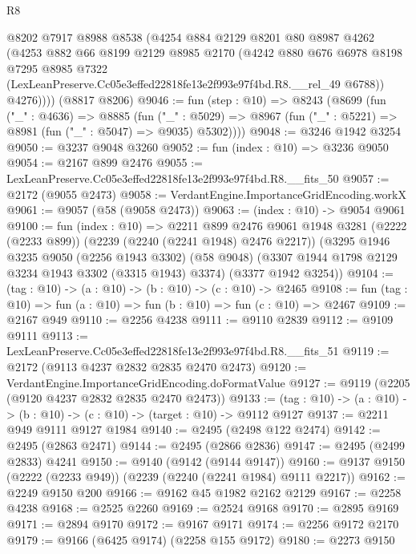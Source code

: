 \begin{lexlean}{R8}
\begin{coremodule}
        @8202
        @7917
        @8988
        @8538
        (@4254
          @884
          @2129
          @8201
          @80
          @8987
          @4262
          (@4253
            @882
            @66
            @8199
            @2129
            @8985
            @2170
            (@4242
              @880
              @676
              @6978
              @8198
              @7295
              @8985
              @7322
              (LexLeanPreserve.Cc05e3effed22818fe13e2f993e97f4bd.R8.__rel_49 @6788))
            @4276))))
    (@8817 @8206)
@9046 := fun (step : @10) =>
  @8243
    (@8699
      (fun ("_" : @4636) =>
      @8885
        (fun ("_" : @5029) =>
        @8967 (fun ("_" : @5221) => @8981 (fun ("_" : @5047) => @9035) @5302))))
@9048 := @3246 @1942 @3254
@9050 := @3237 @9048 @3260
@9052 := fun (index : @10) => @3236 @9050
@9054 := @2167 @899 @2476
@9055 := LexLeanPreserve.Cc05e3effed22818fe13e2f993e97f4bd.R8.__fits_50
@9057 := @2172 (@9055 @2473)
@9058 := VerdantEngine.ImportanceGridEncoding.workX
@9061 := @9057 (@58 (@9058 @2473))
@9063 := (index : @10) -> @9054 @9061
@9100 := fun (index : @10) =>
  @2211
    @899
    @2476
    @9061
    @1948
    @3281
    (@2222 (@2233 @899))
    (@2239 (@2240 (@2241 @1948) @2476 @2217))
    (@3295
      @1946
      @3235
      @9050
      (@2256 @1943 @3302)
      (@58 @9048)
      (@3307 @1944 @1798 @2129 @3234 @1943 @3302 (@3315 @1943) @3374)
      (@3377 @1942 @3254))
@9104 := (tag : @10) -> (a : @10) -> (b : @10) -> (c : @10) -> @2465
@9108 := fun (tag : @10) => fun (a : @10) => fun (b : @10) => fun (c : @10) => @2467
@9109 := @2167 @949
@9110 := @2256 @4238
@9111 := @9110 @2839
@9112 := @9109 @9111
@9113 := LexLeanPreserve.Cc05e3effed22818fe13e2f993e97f4bd.R8.__fits_51
@9119 := @2172 (@9113 @4237 @2832 @2835 @2470 @2473)
@9120 := VerdantEngine.ImportanceGridEncoding.doFormatValue
@9127 := @9119 (@2205 (@9120 @4237 @2832 @2835 @2470 @2473))
@9133 := (tag : @10) -> (a : @10) -> (b : @10) -> (c : @10) -> (target : @10) -> @9112 @9127
@9137 := @2211 @949 @9111 @9127 @1984
@9140 := @2495 (@2498 @122 @2474)
@9142 := @2495 (@2863 @2471)
@9144 := @2495 (@2866 @2836)
@9147 := @2495 (@2499 @2833) @4241
@9150 := @9140 (@9142 (@9144 @9147))
@9160 := @9137 @9150 (@2222 (@2233 @949)) (@2239 (@2240 (@2241 @1984) @9111 @2217))
@9162 := @2249 @9150 @200
@9166 := @9162 @45 @1982 @2162 @2129
@9167 := @2258 @4238
@9168 := @2525 @2260
@9169 := @2524 @9168
@9170 := @2895 @9169
@9171 := @2894 @9170
@9172 := @9167 @9171
@9174 := @2256 @9172 @2170
@9179 := @9166 (@6425 @9174) (@2258 @155 @9172)
@9180 := @2273 @9150

\end{coremodule}
\end{lexlean}

